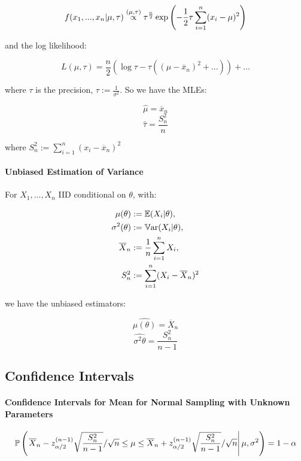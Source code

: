 \documentclass[a4paper]{article}
\begin{document}
                \[
                    f(x_1, ..., x_n | \mu, \tau) \stackrel{({\mu, \tau})}{\propto}
                    \tau^\frac{n}{2} \exp\left(-\frac{1}{2}\tau \sum_{i=1}^n
                    (x_i - \mu)^2\right)
                \]

                and the log likelihood:

                \[
                    L(\mu, \tau) = \frac{n}{2}(\log\tau - \tau((\mu - \overline
                    x_n)^2 + ...)) + ...
                \]

                where $\tau$ is the precision, $\tau := \frac{1}{\sigma^2}$. So
                we have the MLEs:

                \[
                    \widehat \mu = \overline x_n
                \]
                \[
                    \widehat \tau = \frac{S_n^2}{n}
                \]

                where $S_n^2 := \sum\limits_{i=1}^n (x_i - \overline x_n)^2$

            \paragraph{Unbiased Estimation of Variance}
                For $X_1, ..., X_n$ IID conditional on $\theta$, with:

                \begin{align*}
                    \mu(\theta) & := \mathbb{E}(X_i | \theta), \\
                    \sigma^2(\theta) & := \mathbb{V}\text{ar}(X_i | \theta), \\
                    \overline X_n & := \frac{1}{n} \sum\limits_{i=1}^n X_i, \\
                    S_n^2 & := \sum\limits_{i=1}^n (X_i - \overline X_n)^2
                \end{align*}

                we have the unbiased estimators:

                \[
                    \widehat {\mu(\theta)} = \overline X_n
                \]
                \[
                    \widehat {\sigma^2{\theta}} = \frac{S_n^2}{n - 1}
                \]

        \subsection*{Confidence Intervals}
            \paragraph{Confidence Intervals for Mean for Normal Sampling with
            Unknown Parameters}
                \[
                    \mathbb{P}\left(\left.\overline X_n - z_{\alpha/2}^{(n-1)}
                    \sqrt{\frac{S_n^2}{n - 1}} / \sqrt{n} \leq \mu \leq
                    \overline X_n + z_{\alpha/2}^{(n - 1)} \sqrt{\frac{S_n^2}
                    {n - 1}} /\sqrt{n} \right| \mu, \sigma^2\right) = 1 - \alpha
                \]
\end{document}
